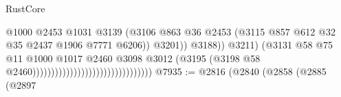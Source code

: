 \begin{lexlean}{RustCore}
\begin{coremodule}
                                                                        @1000
                                                                        @2453
                                                                        @1031
                                                                        @3139
                                                                        (@3106
                                                                          @863
                                                                          @36
                                                                          @2453
                                                                          (@3115
                                                                            @857
                                                                            @612
                                                                            @32
                                                                            @35
                                                                            @2437
                                                                            @1906
                                                                            @7771
                                                                            @6206))
                                                                        @3201))
                                                                    @3188))
                                                                @3211)
                                                              (@3131
                                                                @58
                                                                @75
                                                                @11
                                                                @1000
                                                                @1017
                                                                @2460
                                                                @3098
                                                                @3012
                                                                (@3195
                                                                  (@3198
                                                                    @58
                                                                    @2460))))))))))))))))))))))))))))))))
@7935 := @2816
    (@2840
      (@2858
        (@2885
          (@2897

\end{coremodule}
\end{lexlean}
